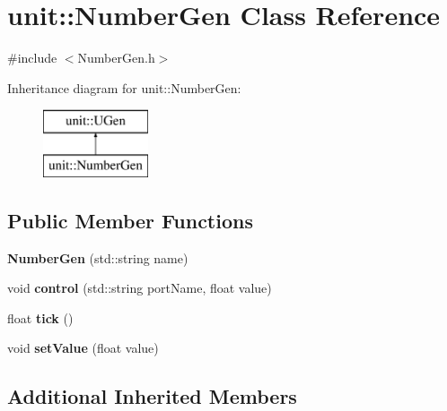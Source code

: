 \hypertarget{classunit_1_1NumberGen}{}\section{unit\+:\+:Number\+Gen Class Reference}
\label{classunit_1_1NumberGen}


{\ttfamily \#include $<$Number\+Gen.\+h$>$}

Inheritance diagram for unit\+:\+:Number\+Gen\+:\begin{figure}[H]
\begin{center}
\leavevmode
\includegraphics[height=2.000000cm]{classunit_1_1NumberGen}
\end{center}
\end{figure}
\subsection*{Public Member Functions}
\begin{DoxyCompactItemize}
\item 
{\bfseries Number\+Gen} (std\+::string name)\hypertarget{classunit_1_1NumberGen_a6e93812c4805a43f19f8fb11680e32a4}{}\label{classunit_1_1NumberGen_a6e93812c4805a43f19f8fb11680e32a4}

\item 
void {\bfseries control} (std\+::string port\+Name, float value)\hypertarget{classunit_1_1NumberGen_a9daaaf8a12389873494bb1ad2f877c8c}{}\label{classunit_1_1NumberGen_a9daaaf8a12389873494bb1ad2f877c8c}

\item 
float {\bfseries tick} ()\hypertarget{classunit_1_1NumberGen_a38cef7d64a12e40bf2ae14f29def41ca}{}\label{classunit_1_1NumberGen_a38cef7d64a12e40bf2ae14f29def41ca}

\item 
void {\bfseries set\+Value} (float value)\hypertarget{classunit_1_1NumberGen_ad5c107c90a5bc6cf7bbc39562db9d9e3}{}\label{classunit_1_1NumberGen_ad5c107c90a5bc6cf7bbc39562db9d9e3}

\end{DoxyCompactItemize}
\subsection*{Additional Inherited Members}


